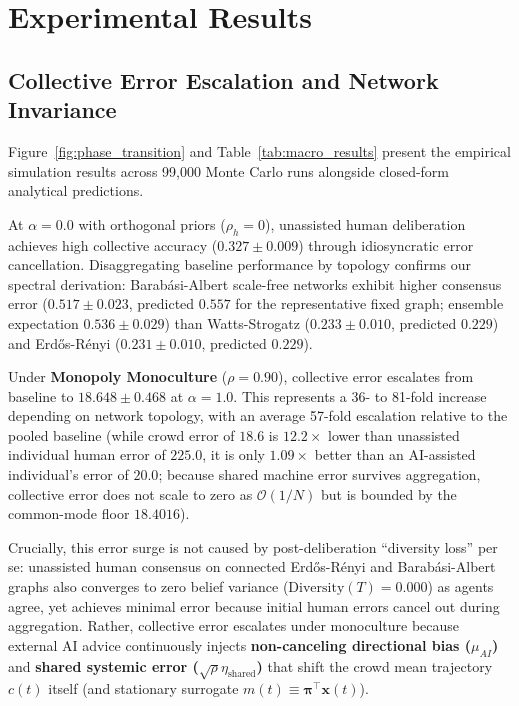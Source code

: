 \documentclass
[letterpaper]{article}
\begin{document}
\section{Experimental Results}

\subsection{Collective Error Escalation and Network Invariance}
Figure~\ref{fig:phase_transition} and Table~\ref{tab:macro_results} present the empirical simulation results across 99,000 Monte Carlo runs alongside closed-form analytical predictions. 

At $\alpha = 0.0$ with orthogonal priors ($\rho_h = 0$), unassisted human deliberation achieves high collective accuracy ($0.327 \pm 0.009$) through idiosyncratic error cancellation. Disaggregating baseline performance by topology confirms our spectral derivation: Barab\'asi-Albert scale-free networks exhibit higher consensus error ($0.517 \pm 0.023$, predicted $0.557$ for the representative fixed graph; ensemble expectation $0.536 \pm 0.029$) than Watts-Strogatz ($0.233 \pm 0.010$, predicted $0.229$) and Erd\H{o}s-R\'enyi ($0.231 \pm 0.010$, predicted $0.229$).

Under \textbf{Monopoly Monoculture} ($\rho = 0.90$), collective error escalates from baseline to $18.648 \pm 0.468$ at $\alpha = 1.0$. This represents a 36- to 81-fold increase depending on network topology, with an average 57-fold escalation relative to the pooled baseline (while crowd error of $18.6$ is $12.2\times$ lower than unassisted individual human error of $225.0$, it is only $1.09\times$ better than an AI-assisted individual's error of $20.0$; because shared machine error survives aggregation, collective error does not scale to zero as $\mathcal{O}(1/N)$ but is bounded by the common-mode floor $18.4016$). 

Crucially, this error surge is not caused by post-deliberation ``diversity loss'' per se: unassisted human consensus on connected Erd\H{o}s-R\'enyi and Barab\'asi-Albert graphs also converges to zero belief variance ($\text{Diversity}(T) = 0.000$) as agents agree, yet achieves minimal error because initial human errors cancel out during aggregation. Rather, collective error escalates under monoculture because external AI advice continuously injects \textbf{non-canceling directional bias ($\mu_{AI}$)} and \textbf{shared systemic error ($\sqrt{\rho}\eta_{\text{shared}}$)} that shift the crowd mean trajectory $c(t)$ itself (and stationary surrogate $m(t) \equiv \boldsymbol{\pi}^\top \mathbf{x}(t)$).
\end{document}
